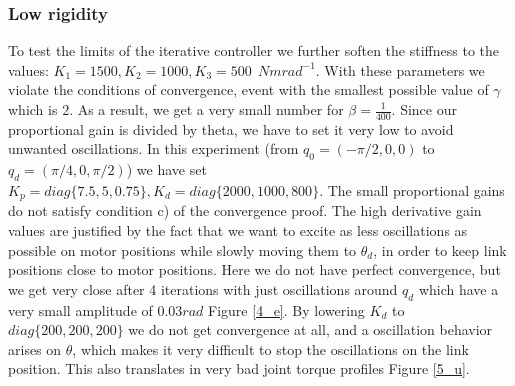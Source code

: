 \subsubsection{Low rigidity}
To test the limits of the iterative controller we further soften the stiffness to the values: $K_1 = 1500, K_2 = 1000, K_3 = 500 ~~Nmrad^{-1}$. With these parameters we violate the conditions of convergence, event with the smallest possible value of \(\gamma\) which is \(2\). As a result, we get a very small number for \(\beta = \frac{1}{400}\). Since our proportional gain is divided by theta, we have to set it very low to avoid unwanted oscillations. In this experiment (from $q_0=(-\pi/2,0,0)$ to $q_d=(\pi/4,0,\pi/2)$) we have set $K_p = diag\{7.5, 5, 0.75\}, K_d=diag\{2000,1000,800\}$. The small proportional gains do not satisfy condition c) of the convergence proof. The high derivative gain values are justified by the fact that we want to excite as less oscillations as possible on motor positions while slowly moving them to \(\theta_d\), in order to keep link positions close to motor positions. Here we do not have perfect convergence, but we get very close after 4 iterations with just oscillations around \(q_d\) which have a very small amplitude of \(0.03 rad\) Figure \ref{4_e}. By lowering \(K_d\) to \(diag\{200,200,200\}\) we do not get convergence at all, and a oscillation behavior arises on \(\theta\), which makes it very difficult to stop the oscillations on the link position. This also translates in very bad joint torque profiles Figure \ref{5_u}.
